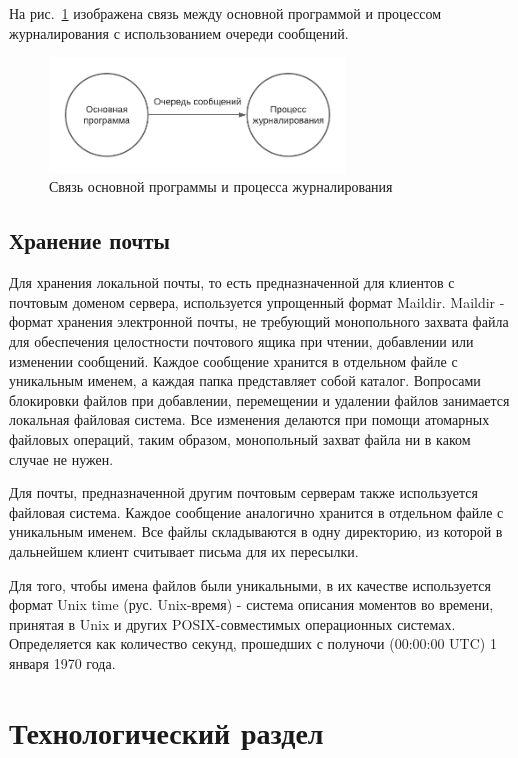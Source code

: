 \documentclass[a4paper,12pt]{report}
\begin{document}
На рис.~\ref{fig:ipc} изображена связь между основной программой и процессом журналирования с использованием очереди сообщений.

\begin{figure}[h]
    \centering
    \includegraphics[width=0.7\textwidth]{pics/ipc.pdf}
    \caption{Связь основной программы и процесса журналирования}
    \label{fig:ipc}
\end{figure}


\section{Хранение почты}

Для хранения локальной почты, то есть предназначенной для клиентов с почтовым доменом сервера, используется упрощенный формат Maildir. Maildir - формат хранения электронной почты, не требующий монопольного захвата файла для обеспечения целостности почтового ящика при чтении, добавлении или изменении сообщений. Каждое сообщение хранится в отдельном файле с уникальным именем, а каждая папка представляет собой каталог. Вопросами блокировки файлов при добавлении, перемещении и удалении файлов занимается локальная файловая система. Все изменения делаются при помощи атомарных файловых операций, таким образом, монопольный захват файла ни в каком случае не нужен.

Для почты, предназначенной другим почтовым серверам также используется файловая система. Каждое сообщение аналогично хранится в отдельном файле с уникальным именем. Все файлы складываются в одну директорию, из которой в дальнейшем клиент считывает письма для их пересылки. 

Для того, чтобы имена файлов были уникальными, в их качестве используется формат Unix time (рус. Unix-время) - система описания моментов во времени, принятая в Unix и других POSIX-совместимых операционных системах. Определяется как количество секунд, прошедших с полуночи (00:00:00 UTC) 1 января 1970 года.


\chapter{Технологический раздел}
\end{document}
